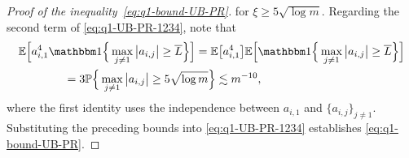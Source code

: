 \begin{proof}[Proof of the inequality~\eqref{eq:q1-bound-UB-PR}]
for $\xi\geq5\sqrt{\log m}$. Regarding the second term of \eqref{eq:q1-UB-PR-1234}, note that
%
\begin{align*}
	& \mathbb{E}\Big[a_{i,1}^{4}\mathbbm1\Big\{\max_{j\neq1}\big|a_{i,j}\big|\geq\overline{L}\Big\}\Big]  =\mathbb{E}\big[a_{i,1}^{4}\big]\mathbb{E}\Big[\mathbbm1\Big\{\max_{j\neq1}\big|a_{i,j}\big|\geq\overline{L}\Big\}\Big]\\
 	& \qquad\qquad =3\mathbb{P}\Big\{\max_{j\neq1}\big|a_{i,j}\big|\geq5\sqrt{\log m}\Big\}\lesssim m^{-10},
\end{align*}
%
where the first identity uses the independence between $a_{i,1}$ and $\{a_{i,j}\}_{j\neq 1}$.
Substituting the preceding bounds into \eqref{eq:q1-UB-PR-1234} establishes \eqref{eq:q1-bound-UB-PR}. \end{proof}


